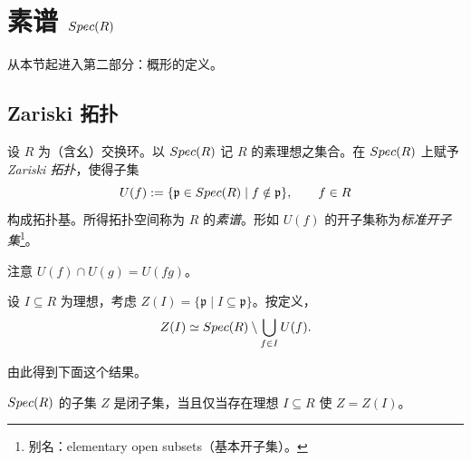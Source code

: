 
\makeatletter
{}
\makeatother

\section{素谱 $Spec(R)$}\label{sec:4}

从本节起进入第二部分：概形的定义。

\subsection{Zariski 拓扑}\label{sec:4.1}

\begin{definition}\label{def:4.1.1}
设 $R$ 为（含幺）交换环。以 $Spec(R)$ 记 $R$ 的素理想之集合。在 $Spec(R)$ 上赋予 \emph{Zariski 拓扑}，使得子集
\[
U(f) := \{\mathfrak p \in Spec(R) \mid f \notin \mathfrak p\},\qquad f \in R
\]
构成拓扑基。所得拓扑空间称为 $R$ 的\emph{素谱}。形如 $U(f)$ 的开子集称为\emph{标准开子集}\footnote{别名：elementary open subsets（基本开子集）。}。
\end{definition}

注意 $U(f) \cap U(g) = U(fg)$。

\begin{construction}\label{con:4.1.2}
设 $I \subseteq R$ 为理想，考虑 $Z(I) = \{\mathfrak p \mid I \subseteq \mathfrak p\}$。按定义，
\[
Z(I) \simeq Spec(R) \setminus \bigcup_{f \in I} U(f).
\]
\end{construction}

由此得到下面这个结果。

\begin{lemma}\label{lem:4.1.3}
$Spec(R)$ 的子集 $Z$ 是闭子集，当且仅当存在理想 $I \subseteq R$ 使 $Z = Z(I)$。
\end{lemma}

